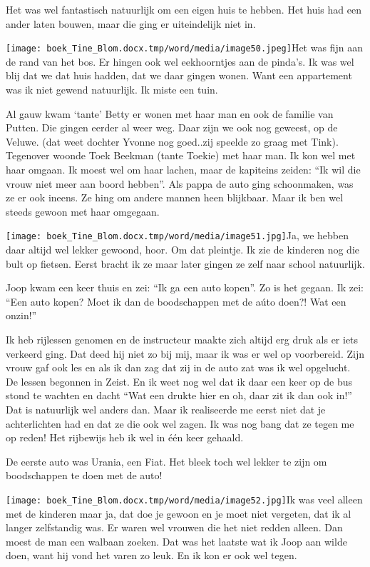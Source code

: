\documentclass{scrbook}
\begin{document}
{Het was wel fantastisch natuurlijk om een eigen huis te hebben. Het huis had een ander laten bouwen, maar die ging er uiteindelijk niet in. 

\texttt{[image: boek\_Tine\_Blom.docx.tmp/word/media/image50.jpeg]}Het was fijn aan de rand van het bos. Er hingen ook wel eekhoorntjes aan de pinda’s. Ik was wel blij dat we dat huis hadden, dat we daar gingen wonen. Want een appartement was ik niet gewend natuurlijk. Ik miste een tuin.

Al gauw kwam ‘tante’ Betty er wonen met haar man en ook de familie van Putten. Die gingen eerder al weer weg. Daar zijn we ook nog geweest, op de Veluwe. (dat weet dochter Yvonne nog goed..zij speelde zo graag met Tink). Tegenover woonde Toek Beekman (tante Toekie) met haar man. Ik kon wel met haar omgaan. Ik moest wel om haar lachen, maar de kapiteins zeiden: ``Ik wil die vrouw niet meer aan boord hebben''. Als pappa de auto ging schoonmaken, was ze er ook ineens. Ze hing om andere mannen heen blijkbaar. Maar ik ben wel steeds gewoon met haar omgegaan.

\texttt{[image: boek\_Tine\_Blom.docx.tmp/word/media/image51.jpg]}Ja, we hebben daar altijd wel lekker gewoond, hoor. Om dat pleintje. Ik zie de kinderen nog die bult op fietsen. Eerst bracht ik ze maar later gingen ze zelf naar school natuurlijk.

Joop kwam een keer thuis en zei: ``Ik ga een auto kopen''. Zo is het gegaan. Ik zei: ``Een auto kopen? Moet ik dan de boodschappen met de a\'{u}to doen?! Wat een onzin!'' 

Ik heb rijlessen genomen en de instructeur maakte zich altijd erg druk als er iets verkeerd ging. Dat deed hij niet zo bij mij, maar ik was er wel op voorbereid. Zijn vrouw gaf ook les en als ik dan zag dat zij in de auto zat was ik wel opgelucht. De lessen begonnen in Zeist. En ik weet nog wel dat ik daar een keer op de bus stond te wachten en dacht ``Wat een drukte hier en oh, daar zit ik dan ook in!'' Dat is natuurlijk wel anders dan. Maar ik realiseerde me eerst niet dat je achterlichten had en dat ze die ook wel zagen. Ik was nog bang dat ze tegen me op reden! Het rijbewijs heb ik wel in \'{e}\'{e}n keer gehaald.~

De eerste auto was Urania, een Fiat. Het bleek toch wel lekker te zijn om boodschappen te doen met de auto!

\texttt{[image: boek\_Tine\_Blom.docx.tmp/word/media/image52.jpg]}Ik was veel alleen met de kinderen maar ja, dat doe je gewoon en je moet niet vergeten, dat ik al langer zelfstandig was. Er waren wel vrouwen die het niet redden alleen. Dan moest de man een walbaan zoeken. Dat was het laatste wat ik Joop aan wilde doen, want hij vond het varen zo leuk. En ik kon er ook wel tegen.

}
\end{document}
